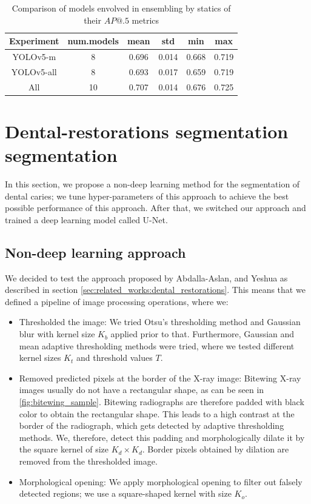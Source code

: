 \begin{table}[h]
    \centering
    \begin{tabular}{|c|c|c|c|c|c|}
        \hline
        Experiment & num.models & mean  & std   & min   & max   \\ \hline
        YOLOv5-m   & 8          & 0.696 & 0.014 & 0.668 & 0.719 \\ \hline
        YOLOv5-all & 8          & 0.693 & 0.017 & 0.659 & 0.719 \\ \hline
        All        & 10         & 0.707 & 0.014 & 0.676 & 0.725 \\ \hline
    \end{tabular}
    \caption{Comparison of models envolved in ensembling by statics of their $AP@.5$ metrics}
    \label{tab:ensemble_models_involved}
\end{table}

\section{Dental-restorations segmentation segmentation}
\label{sec:methods:dental_restorations}
In this section, we propose a non-deep learning method for the segmentation of dental caries; we tune hyper-parameters of this approach to achieve the best possible performance of this approach. After that, we switched our approach and trained a deep learning model called U-Net.
\subsection{Non-deep learning approach}
We decided to test the approach proposed by Abdalla-Aslan, and Yeshua \cite{AbdallaAslan2020, Yeshua2019} as described in section \ref{sec:related_works:dental_restorations}. This means that we defined a pipeline of image processing operations, where we:
\begin{itemize}
    \item Thresholded the image: We tried Otsu's thresholding method and Gaussian blur with kernel size $K_b$ applied prior to that. Furthermore, Gaussian and mean adaptive thresholding methods were tried, where we tested different kernel sizes $K_t$ and threshold values $T$.
    \item Removed predicted pixels at the border of the X-ray image: Bitewing X-ray images usually do not have a rectangular shape, as can be seen in \ref{fig:bitewing_sample}. Bitewing radiographs are therefore padded with black color to obtain the rectangular shape. This leads to a high contrast at the border of the radiograph, which gets detected by adaptive thresholding methods. We, therefore, detect this padding and morphologically dilate it by the square kernel of size $K_d \times K_d$. Border pixels obtained by dilation are removed from the thresholded image.
    \item Morphological opening: We apply morphological opening to filter out falsely detected regions; we use a square-shaped kernel with size $K_o$.
\end{itemize}

